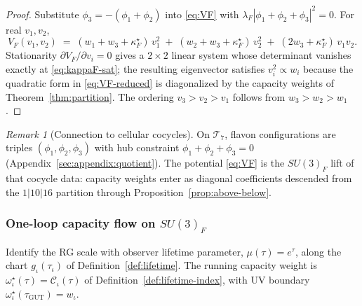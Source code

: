 \documentclass[aps,prd,onecolumn,amsmath,amssymb,nofootinbib,11pt]{revtex4-2}
\numberwithin{equation}{section}
\theoremstyle{plain}
\theoremstyle{definition}
\theoremstyle{remark}
\newtheorem{remark}[theorem]{Remark}
\newcommand{\capacity}{\mathcal{C}}
\begin{document}
\begin{proof}
Substitute $\phi_3=-(\phi_1+\phi_2)$ into \eqref{eq:VF} with
$\lambda_F|\phi_1+\phi_2+\phi_3|^2=0$. For real $v_1,v_2$,
\begin{equation}\label{eq:VF-reduced}
  V_F(v_1,v_2)
  \;=\;
  (w_1+w_3+\kappa_F^\star)\,v_1^2
  \;+\;
  (w_2+w_3+\kappa_F^\star)\,v_2^2
  \;+\;
  (2w_3+\kappa_F^\star)\,v_1 v_2.
\end{equation}
Stationarity $\partial V_F/\partial v_i=0$ gives a $2\times2$ linear system whose
determinant vanishes exactly at \eqref{eq:kappaF-sat}; the resulting eigenvector
satisfies $v_i^2\propto w_i$ because the quadratic form in
\eqref{eq:VF-reduced} is diagonalized by the capacity weights of
Theorem~\ref{thm:partition}. The ordering $v_3>v_2>v_1$ follows from
$w_3>w_2>w_1$.
\end{proof}

\begin{remark}[Connection to cellular cocycles]
On $\mathcal{T}_7$, flavon configurations are triples
$(\phi_1,\phi_2,\phi_3)$ with hub constraint $\phi_1+\phi_2+\phi_3=0$
(Appendix~\ref{sec:appendix:quotient}). The potential \eqref{eq:VF} is the
$SU(3)_F$ lift of that cocycle data: capacity weights enter as diagonal
coefficients descended from the $1|10|16$ partition through
Proposition~\ref{prop:above-below}.
\end{remark}

\subsubsection{One-loop capacity flow on \texorpdfstring{$SU(3)_F$}{SU(3)F}}

Identify the RG scale with observer lifetime parameter,
$\mu(\tau)=e^\tau$, along the chart $g_\iota(\tau_\iota)$ of
Definition~\ref{def:lifetime}. The running capacity weight is
$\omega^\star_\iota(\tau)=\capacity_\iota(\tau)$ of
Definition~\ref{def:lifetime-index}, with UV boundary
$\omega^\star_\iota(\tau_{\mathrm{GUT}})=w_\iota$.
\end{document}
